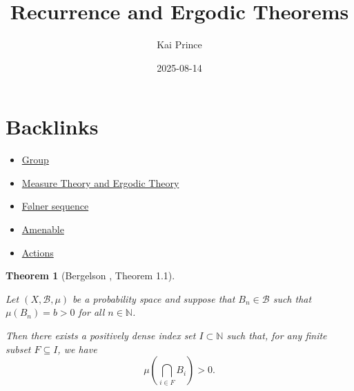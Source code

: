 \documentclass[
  british,
]{article}
\title{Recurrence and Ergodic Theorems}
\author{Kai Prince}
\date{2025-08-14}
\providecommand{\tightlist}{%
  \setlength{\itemsep}{0pt}\setlength{\parskip}{0pt}}
\renewcommand*\contentsname{Table of contents}
\newcommand\contentsname{Table of contents}
\theoremstyle{plain}
\newtheorem{theorem}{Theorem}[section]
\theoremstyle{plain}
\theoremstyle{remark}
\newcommand{\Measure}{{\mu}}
\newcommand{\SigmaAlgebra}[1]{{\mathscr{#1}}}
\begin{document}
\maketitle

\renewcommand*\contentsname{Table of contents}
{
\hypersetup{linkcolor=}
\setcounter{tocdepth}{3}
\tableofcontents
}

\section*{Backlinks}\label{sec-Backlinks}

\begin{itemize}
\tightlist
\item
  \href{../../MathsNotes/0_Fundamental/group.html}{Group}
\item
  \href{../../MathsNotes/2_Topological_Dynamics/measure-ergodic-theory.html}{Measure Theory and Ergodic Theory}
\item
  \href{../../MathsNotes/1_Amenable_and_Density/folner.html}{Følner sequence}
\item
  \href{../../MathsNotes/1_Amenable_and_Density/amenable.html}{Amenable}
\item
  \href{../../MathsNotes/2_Topological_Dynamics/actions.html}{Actions}
\end{itemize}

\begin{theorem}[Bergelson
, Theorem
1.1]\protect\hypertarget{thm-recurrence}{}\label{thm-recurrence}

Let \((X,\SigmaAlgebra{B},\Measure)\) be a probability space and suppose
that \(B_n\in\SigmaAlgebra{B}\) such that \(\Measure(B_n)=b>0\) for all
\(n\in\mathbb{N}\).

Then there exists a positively dense index set \(I\subset\mathbb{N}\)
such that, for any finite subset \(F\subseteq I\), we have
\[\Measure\left(\bigcap_{i\in F}B_i \right)>0. \]

\end{theorem}
\end{document}
